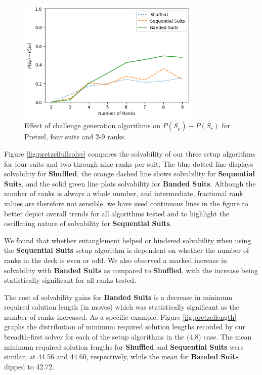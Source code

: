\documentclass[journal]{IEEEtran}
\begin{document}
\begin{figure}[t]
\includegraphics[width=8.8cm]{pretzelfullinterest.png}
\caption{Effect of challenge generation algorithms on $P(S_p) - P(S_r)$ for Pretzel, four suits and 2-9 ranks.}
\label{fig:pretzelinterest}
\end{figure}

Figure \ref{fig:pretzelfullsolve} compares the solvability of our three setup algorithms for four suits and two through nine ranks per suit. The blue dotted line displays solvability for \textbf{Shuffled}, the orange dashed line shows solvability for \textbf{Sequential Suits}, and the solid green line plots solvability for \textbf{Banded Suits}. Although the number of ranks is always a whole number, and intermediate, fractional rank values are therefore not sensible, we have used continuous lines in the figure to better depict overall trends for all algorithms tested and to highlight the oscillating nature of solvability for \textbf{Sequential Suits}.

We found that whether entanglement helped or hindered solvability when using the \textbf{Sequential Suits} setup algorithm is dependent on whether the number of ranks in the deck is even or odd. We also observed a marked increase in solvability with \textbf{Banded Suits} as compared to \textbf{Shuffled}, with the increase being statistically significant for all ranks tested.

The cost of solvability gains for \textbf{Banded Suits} is a decrease in minimum required solution length (in moves) which was statistically significant as the number of ranks increased. As a specific example, Figure \ref{fig:pretzellength} graphs the distribution of minimum required solution lengths recorded by our breadth-first solver for each of the setup algorithms in the (4,8) case. The mean minimum required solution lengths for \textbf{Shuffled} and \textbf{Sequential Suits} were similar, at 44.56 and 44.60, respectively, while the mean for \textbf{Banded Suits} dipped to 42.72.
\end{document}
